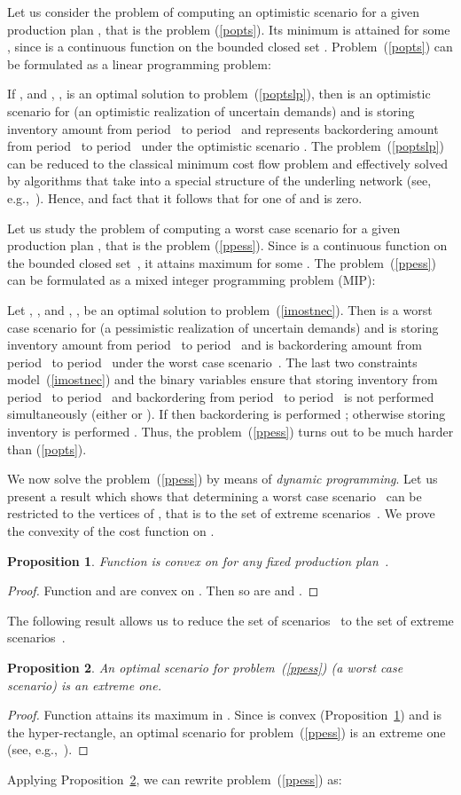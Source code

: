 \documentclass[11pt]{article}
\newtheorem{prop}{Proposition}
\begin{document}
Let us consider the problem of computing an optimistic 
scenario for a given production plan , that
is the problem (\ref{popts}).
Its minimum is attained for some ,
since  is a continuous function on the bounded closed set .
Problem~(\ref{popts}) 
can be formulated as a linear programming problem:

If ,  and , ,
 is an optimal solution to problem~(\ref{poptslp}), then
 is an optimistic scenario for  
(an optimistic realization of uncertain demands)
and 
  is storing inventory amount
from period~ to period~ and 
 represents backordering amount from period~ to
period~ under the optimistic scenario .
The problem~(\ref{poptslp}) can be reduced to the classical minimum
cost flow problem and effectively solved by algorithms that take into 
a special structure of the underling network (see, e.g.,~\cite{AH08}).
Hence, and fact that  it follows that for 
one of  and  is zero.

Let us study   the problem of computing a worst case 
scenario for a given production plan , that
is the problem (\ref{ppess}).
Since  is a continuous function on the bounded closed set~,
it attains maximum  for some .
The problem~(\ref{ppess})
can be formulated as a mixed integer programming problem (MIP):

Let , ,  and , , be
 an optimal solution to problem~(\ref{imostnec}). Then
 is a worst case scenario for  
(a pessimistic realization of uncertain demands)
and 
  is storing inventory amount
from period~ to period~ and 
 is backordering amount from period~ to
period~ under the worst case scenario~.
The last two constraints model~(\ref{imostnec})
and the binary variables  ensure
that storing inventory  from period~ to period~
and backordering  from period~ to
period~ is not performed simultaneously 
(either  or ). If  then
backordering is performed ; otherwise 
storing inventory is performed .
Thus, the problem~(\ref{ppess}) turns out to be much harder than (\ref{popts}).

We now solve the problem~(\ref{ppess})  by means of \emph{dynamic programming}.
Let us present a
result which shows that
determining a worst case scenario~ 
can be restricted to the vertices of , that is to the set
of  extreme scenarios~.
We prove the convexity of the cost function on .
\begin{prop}
Function  is convex on  for any fixed production 
plan~.
\label{ofcon}
\end{prop}
\begin{proof}
Function  and 
are convex on . Then so are 
and .
\end{proof}
The following result allows us to 
reduce the set of scenarios~  to the set
of  extreme scenarios~.
\begin{prop}
An optimal scenario for problem~(\ref{ppess}) (a worst case scenario) is an extreme one.
\label{pext}
\end{prop}
\begin{proof}
	Function  attains its maximum in .
	Since  is convex (Proposition~\ref{ofcon}) 
	and  is the hyper-rectangle,
	an optimal scenario 
	for problem~(\ref{ppess}) is an extreme one
	(see, e.g.,~\cite{M75}).
\end{proof}
Applying Proposition~\ref{pext}, we can rewrite problem~(\ref{ppess}) as:
\end{document}
